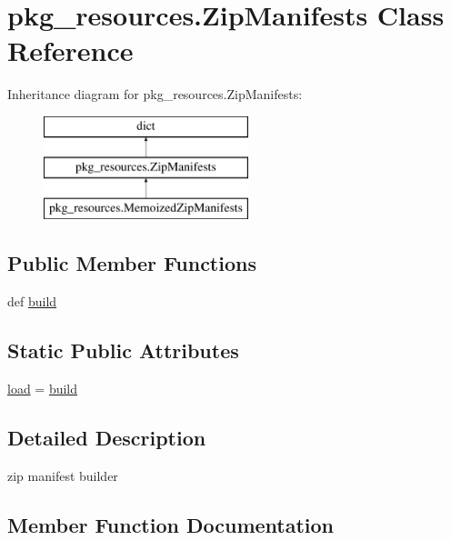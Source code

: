 \hypertarget{classpkg__resources_1_1ZipManifests}{}\section{pkg\+\_\+resources.\+Zip\+Manifests Class Reference}
\label{classpkg__resources_1_1ZipManifests}
Inheritance diagram for pkg\+\_\+resources.\+Zip\+Manifests\+:\begin{figure}[H]
\begin{center}
\leavevmode
\includegraphics[height=3.000000cm]{classpkg__resources_1_1ZipManifests}
\end{center}
\end{figure}
\subsection*{Public Member Functions}
\begin{DoxyCompactItemize}
\item 
def \hyperlink{classpkg__resources_1_1ZipManifests_acf76de439a2a322ae144c42354df6cfa}{build}
\end{DoxyCompactItemize}
\subsection*{Static Public Attributes}
\begin{DoxyCompactItemize}
\item 
\hyperlink{classpkg__resources_1_1ZipManifests_ad5c645f8502e06b9c45014a1f8cce637}{load} = \hyperlink{classpkg__resources_1_1ZipManifests_acf76de439a2a322ae144c42354df6cfa}{build}
\end{DoxyCompactItemize}


\subsection{Detailed Description}
\begin{DoxyVerb}zip manifest builder
\end{DoxyVerb}
 

\subsection{Member Function Documentation}
\hypertarget{classpkg__resources_1_1ZipManifests_acf76de439a2a322ae144c42354df6cfa}{}
